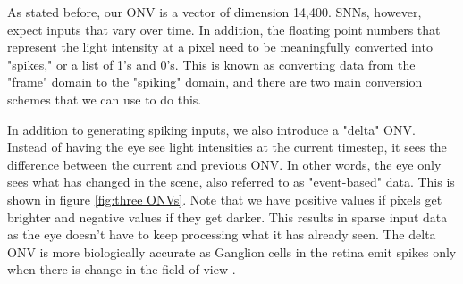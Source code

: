 \documentclass[../taasin.tex]{subfiles}
\begin{document}

As stated before, our ONV is a vector of dimension 14,400. SNNs, however, expect inputs that vary over time. In addition, the floating point numbers that represent the light intensity at a pixel need to be meaningfully converted into "spikes," or a list of 1's and 0's. This is known as converting data from the "frame" domain to the "spiking" domain, and there are two main conversion schemes that we can use to do this.

In addition to generating spiking inputs, we also introduce a "delta" ONV. Instead of having the eye see light intensities at the current timestep, it sees the difference between the current and previous ONV. In other words, the eye only sees what has changed in the scene, also referred to as "event-based" data. This is shown in figure \ref{fig:three ONVs}. Note that we have positive values if pixels get brighter and negative values if they get darker. This results in sparse input data as the eye doesn't have to keep processing what it has already seen. The delta ONV is more biologically accurate as Ganglion cells in the retina emit spikes only when there is change in the field of view \cite{eventRetina}.
\end{document}

